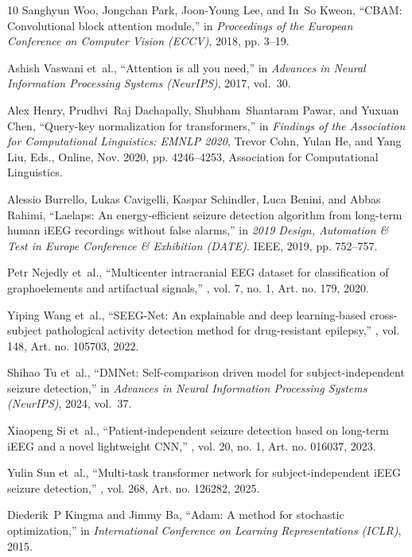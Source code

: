 \documentclass[letterpaper]{article}
\begin{document}
\begin{thebibliography}{10}
Sanghyun Woo, Jongchan Park, Joon-Young Lee, and In~So Kweon,
\newblock ``{CBAM}: Convolutional block attention module,''
\newblock in {\em Proceedings of the European Conference on Computer Vision
  (ECCV)}, 2018, pp. 3--19.

Ashish Vaswani et~al.,
\newblock ``Attention is all you need,''
\newblock in {\em Advances in Neural Information Processing Systems (NeurIPS)},
  2017, vol.~30.

Alex Henry, Prudhvi~Raj Dachapally, Shubham~Shantaram Pawar, and Yuxuan Chen,
\newblock ``Query-key normalization for transformers,''
\newblock in {\em Findings of the Association for Computational Linguistics:
  EMNLP 2020}, Trevor Cohn, Yulan He, and Yang Liu, Eds., Online, Nov. 2020,
  pp. 4246--4253, Association for Computational Linguistics.

Alessio Burrello, Lukas Cavigelli, Kaspar Schindler, Luca Benini, and Abbas
  Rahimi,
\newblock ``Laelaps: An energy-efficient seizure detection algorithm from
  long-term human {iEEG} recordings without false alarms,''
\newblock in {\em 2019 Design, Automation \& Test in Europe Conference \&
  Exhibition (DATE)}. IEEE, 2019, pp. 752--757.

Petr Nejedly et~al.,
\newblock ``Multicenter intracranial {EEG} dataset for classification of
  graphoelements and artifactual signals,''
, vol. 7, no. 1, Art. no. 179, 2020.

Yiping Wang et~al.,
\newblock ``{SEEG-Net}: An explainable and deep learning-based cross-subject
  pathological activity detection method for drug-resistant epilepsy,''
, vol. 148, Art. no. 105703, 2022.

Shihao Tu et~al.,
\newblock ``{DMNet}: Self-comparison driven model for subject-independent
  seizure detection,''
\newblock in {\em Advances in Neural Information Processing Systems (NeurIPS)},
  2024, vol.~37.

Xiaopeng Si et~al.,
\newblock ``Patient-independent seizure detection based on long-term {iEEG} and
  a novel lightweight {CNN},''
, vol. 20, no. 1, Art. no. 016037,
  2023.

Yulin Sun et~al.,
\newblock ``Multi-task transformer network for subject-independent {iEEG}
  seizure detection,''
, vol. 268, Art. no. 126282, 2025.

Diederik~P Kingma and Jimmy Ba,
\newblock ``Adam: A method for stochastic optimization,''
\newblock in {\em International Conference on Learning Representations (ICLR)},
  2015.

\end{thebibliography}
\end{document}
